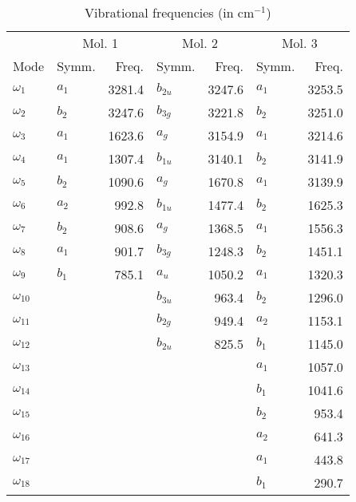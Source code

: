 \begin{table}
\centering
\caption{Vibrational frequencies (in cm$^{-1}$)}
\begin{tabular}{llrlrlr}
 & \multicolumn{2}{c}{Mol. 1} & \multicolumn{2}{c}{Mol. 2} & \multicolumn{2}{c}{Mol. 3} \\
Mode &  Symm. &    Freq. &  Symm. &    Freq. &  Symm. &    Freq. \\
\hline
 $\omega_{1 }$ & $   a_1$ &   3281.4 & $b_{2u}$ &   3247.6 & $   a_1$ &   3253.5 \\
 $\omega_{2 }$ & $   b_2$ &   3247.6 & $b_{3g}$ &   3221.8 & $   b_2$ &   3251.0 \\
 $\omega_{3 }$ & $   a_1$ &   1623.6 & $   a_g$ &   3154.9 & $   a_1$ &   3214.6 \\
 $\omega_{4 }$ & $   a_1$ &   1307.4 & $b_{1u}$ &   3140.1 & $   b_2$ &   3141.9 \\
 $\omega_{5 }$ & $   b_2$ &   1090.6 & $   a_g$ &   1670.8 & $   a_1$ &   3139.9 \\
 $\omega_{6 }$ & $   a_2$ &    992.8 & $b_{1u}$ &   1477.4 & $   b_2$ &   1625.3 \\
 $\omega_{7 }$ & $   b_2$ &    908.6 & $   a_g$ &   1368.5 & $   a_1$ &   1556.3 \\
 $\omega_{8 }$ & $   a_1$ &    901.7 & $b_{3g}$ &   1248.3 & $   b_2$ &   1451.1 \\
 $\omega_{9 }$ & $   b_1$ &    785.1 & $   a_u$ &   1050.2 & $   a_1$ &   1320.3 \\
 $\omega_{10}$ &          &          & $b_{3u}$ &    963.4 & $   b_2$ &   1296.0 \\
 $\omega_{11}$ &          &          & $b_{2g}$ &    949.4 & $   a_2$ &   1153.1 \\
 $\omega_{12}$ &          &          & $b_{2u}$ &    825.5 & $   b_1$ &   1145.0 \\
 $\omega_{13}$ &          &          &          &          & $   a_1$ &   1057.0 \\
 $\omega_{14}$ &          &          &          &          & $   b_1$ &   1041.6 \\
 $\omega_{15}$ &          &          &          &          & $   b_2$ &    953.4 \\
 $\omega_{16}$ &          &          &          &          & $   a_2$ &    641.3 \\
 $\omega_{17}$ &          &          &          &          & $   a_1$ &    443.8 \\
 $\omega_{18}$ &          &          &          &          & $   b_1$ &    290.7 \\

\end{tabular}
\end{table}
